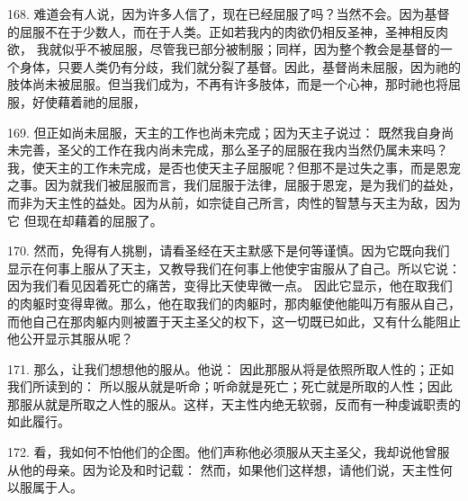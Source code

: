 168. 难道会有人说，因为许多人信了，现在已经屈服了吗？当然不会。因为基督的屈服不在于少数人，而在于人类。正如若我内的肉欲仍相反圣神，圣神相反肉欲， 我就似乎不被屈服，尽管我已部分被制服；同样，因为整个教会是基督的一个身体，只要人类仍有分歧，我们就分裂了基督。因此，基督尚未屈服，因为祂的肢体尚未被屈服。但当我们成为，不再有许多肢体，而是一个心神，那时祂也将屈服，好使藉着祂的屈服，\par

169. 但正如尚未屈服，天主的工作也尚未完成；因为天主子说过： 既然我自身尚未完善，圣父的工作在我内尚未完成，那么圣子的屈服在我内当然仍属未来吗？我，使天主的工作未完成，是否也使天主子屈服呢？但那不是过失之事，而是恩宠之事。因为就我们被屈服而言，我们屈服于法律，屈服于恩宠，是为我们的益处，而非为天主性的益处。因为从前，如宗徒自己所言，肉性的智慧与天主为敌，因为它 但现在却藉着的屈服了。\par

\par

170. 然而，免得有人挑剔，请看圣经在天主默感下是何等谨慎。因为它既向我们显示在何事上服从了天主，又教导我们在何事上他使宇宙服从了自己。所以它说： 因为我们看见因着死亡的痛苦，变得比天使卑微一点。 因此它显示，他在取我们的肉躯时变得卑微。那么，他在取我们的肉躯时，那肉躯使他能叫万有服从自己，而他自己在那肉躯内则被置于天主圣父的权下，这一切既已如此，又有什么能阻止他公开显示其服从呢？\par

171. 那么，让我们想想他的服从。他说： 因此那服从将是依照所取人性的；正如我们所读到的： 所以服从就是听命；听命就是死亡；死亡就是所取的人性；因此那服从就是所取之人性的服从。这样，天主性内绝无软弱，反而有一种虔诚职责的如此履行。\par

172. 看，我如何不怕他们的企图。他们声称他必须服从天主圣父，我却说他曾服从他的母亲。因为论及和时记载： 然而，如果他们这样想，请他们说，天主性何以服属于人。\par

